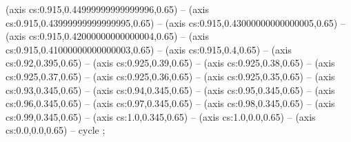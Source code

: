 (axis cs:0.915,0.44999999999999996,0.65) -- (axis cs:0.915,0.43999999999999995,0.65) -- (axis cs:0.915,0.43000000000000005,0.65) -- (axis cs:0.915,0.42000000000000004,0.65) -- (axis cs:0.915,0.41000000000000003,0.65) -- (axis cs:0.915,0.4,0.65) -- (axis cs:0.92,0.395,0.65) -- (axis cs:0.925,0.39,0.65) -- (axis cs:0.925,0.38,0.65) -- (axis cs:0.925,0.37,0.65) -- (axis cs:0.925,0.36,0.65) -- (axis cs:0.925,0.35,0.65) -- (axis cs:0.93,0.345,0.65) -- (axis cs:0.94,0.345,0.65) -- (axis cs:0.95,0.345,0.65) -- (axis cs:0.96,0.345,0.65) -- (axis cs:0.97,0.345,0.65) -- (axis cs:0.98,0.345,0.65) -- (axis cs:0.99,0.345,0.65) -- (axis cs:1.0,0.345,0.65) -- (axis cs:1.0,0.0,0.65) -- (axis cs:0.0,0.0,0.65) -- cycle
;
